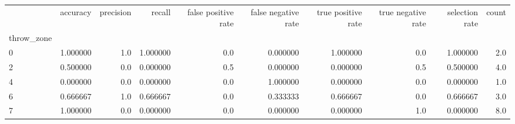 \begin{tabular}{lrrrrrrrrr}
\toprule
{} &  accuracy &  precision &    recall &  false positive rate &  false negative rate &  true positive rate &  true negative rate &  selection rate &  count \\
throw\_zone &           &            &           &                      &                      &                     &                     &                 &        \\
\midrule
0          &  1.000000 &        1.0 &  1.000000 &                  0.0 &             0.000000 &            1.000000 &                 0.0 &        1.000000 &    2.0 \\
2          &  0.500000 &        0.0 &  0.000000 &                  0.5 &             0.000000 &            0.000000 &                 0.5 &        0.500000 &    4.0 \\
4          &  0.000000 &        0.0 &  0.000000 &                  0.0 &             1.000000 &            0.000000 &                 0.0 &        0.000000 &    1.0 \\
6          &  0.666667 &        1.0 &  0.666667 &                  0.0 &             0.333333 &            0.666667 &                 0.0 &        0.666667 &    3.0 \\
7          &  1.000000 &        0.0 &  0.000000 &                  0.0 &             0.000000 &            0.000000 &                 1.0 &        0.000000 &    8.0 \\
\bottomrule
\end{tabular}
